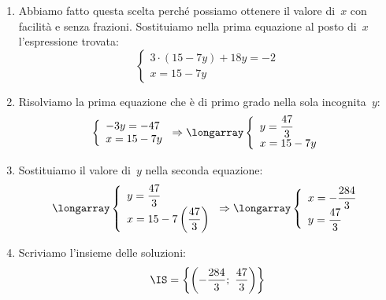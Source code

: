 \begin{exrig}
\begin{esempio}
\begin{enumerate}
\item Abbiamo fatto questa scelta perché possiamo ottenere il valore di~$x$
con facilità e senza frazioni. Sostituiamo nella prima equazione al posto di~$x$
l'espressione trovata:
\[\left\{\begin{array}{l}
          3\cdot(15-7y)+18y=-2\\
          x=15-7y
          \end{array}\right.
\]
\item Risolviamo la prima equazione che è di primo grado nella sola
incognita~$y$:
\[\left\{\begin{array}{l}
          -3y=-47\\
          x=15-7y
          \end{array}\right.
\Rightarrow\longarray\left\{\begin{array}{l}
          y=\dfrac{47}{3}\\
          x=15-7y
         \end{array}\right.\]
\item Sostituiamo il valore di~$y$ nella seconda equazione:
\[\longarray\left\{\begin{array}{l}
          y=\dfrac{47}{3}\\
          x=15-7\left(\dfrac{47}{3}\right)
          \end{array}\right.
\Rightarrow \longarray\left\{\begin{array}{l}x=-\dfrac{284}{3}\\
 y=\dfrac{47}{3}\end{array}\right.\]
\item Scriviamo l'insieme delle soluzioni:
\[\IS=\left\{\left(-\frac{284}{3};~\frac{47}{3}\right)\right\}\]
\end{enumerate}


\end{esempio}
\end{exrig}
